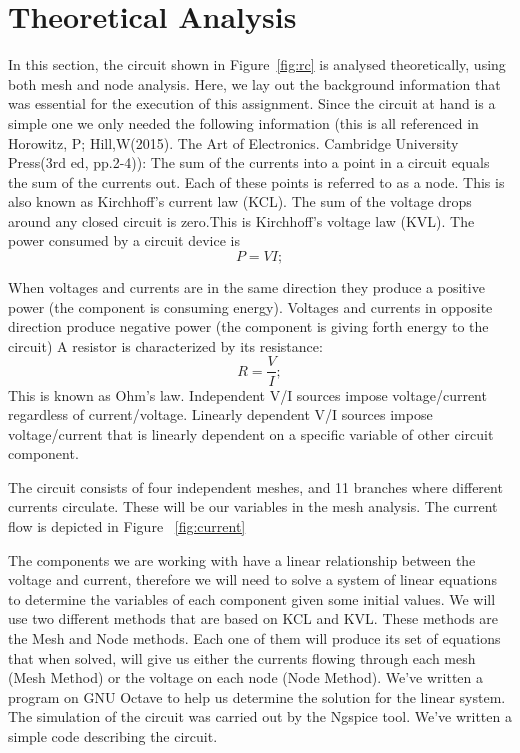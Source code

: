 \section{Theoretical Analysis}
\label{sec:analysis}

In this section, the circuit shown in Figure~\ref{fig:rc} is analysed
theoretically, using both mesh and node analysis.
Here, we lay out the background information that was essential for the execution of this assignment. Since the circuit at hand is a simple one we only needed the following information (this is all referenced in Horowitz, P; Hill,W(2015). The Art of Electronics. Cambridge University Press(3rd ed, pp.2-4)):
The sum of the currents into a point in a circuit equals the sum of the currents out. Each of these points is referred to as a node. This is also known as Kirchhoff’s current law (KCL).
The sum of the voltage drops around any closed circuit is zero.This is Kirchhoff’s voltage law (KVL).
The power consumed by a circuit device is
\begin{equation}
  P=VI;
\end{equation}

When voltages and currents are in the same direction they produce a positive power (the component is consuming energy). Voltages and currents in opposite direction produce negative power (the component is giving forth energy to the circuit)
A resistor is characterized by its resistance:
\begin{equation}
  R=\frac {V}{I};
\end{equation}
This is known as Ohm’s law.
Independent V/I sources impose voltage/current regardless of current/voltage.
Linearly dependent V/I sources impose voltage/current that is linearly dependent on a specific variable of other circuit component.

The circuit consists of four independent meshes, and 11 branches where different currents circulate. These will be our variables in the mesh analysis. The current flow is depicted in Figure ~\ref{fig:current}


The components we are working with have a linear relationship between the voltage and current, therefore we will need to solve a system of linear equations to determine the variables of each component given some initial values.
We will use two different methods that are based on KCL and KVL. These methods are the Mesh and Node methods. Each one of them will produce its set of equations that when solved, will give  us either the currents flowing through each mesh (Mesh Method) or the voltage on each node (Node Method).
We’ve written a program on GNU Octave to help us determine the solution for the linear system. The simulation of the circuit was carried out by the Ngspice tool. We’ve written a simple code describing the circuit.

